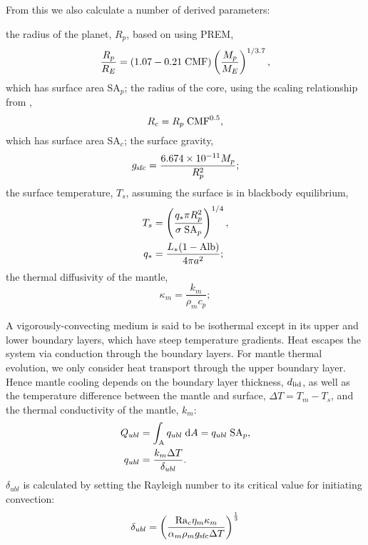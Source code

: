 \documentclass[10pt,a4paper]{article}
\begin{document}
From this we also calculate a number of derived parameters:

the radius of the planet, $R_p$, based on \citet{Zeng2016} using PREM,
\begin{equation}
\frac{R_p}{R_E} = (1.07 - 0.21\; {\rm CMF})\left(\frac{M_p}{M_E}\right)^{1/3.7},
\end{equation}
which has surface area SA$_p$; the radius of the core, using the scaling relationship from \citet{Zeng2017},
\begin{equation}
R_c = R_p \; {\rm CMF}^{0.5},
\end{equation}
which has surface area SA$_c$; the surface gravity,
\begin{equation}
g_{\rm sfc} =\frac{6.674\times 10^{-11}M_p}{R_p^2};
\end{equation}
the surface temperature, $T_s$, assuming the surface is in blackbody equilibrium,
\begin{align}
T_s &= \left(\frac{q_* \pi R_p^2}{\sigma \; {\rm SA}_p}\right)^{1/4},\\
q_* &= \frac{L_*(1-{\rm Alb})}{4 \pi a^2};
\end{align}
the thermal diffusivity of the mantle,
\begin{equation}
\kappa_m = \frac{k_m}{\rho_m c_p};
\end{equation}

A vigorously-convecting medium is said to be isothermal except in its upper and lower boundary layers, which have steep temperature gradients.  Heat escapes the system via conduction through the boundary layers. For mantle thermal evolution, we only consider heat transport through the upper boundary layer. Hence mantle cooling depends on the boundary layer thickness, $d_{\rm lid}$, as well as the temperature difference between the mantle and surface, $\Delta T = T_m - T_s$, and the thermal conductivity of the mantle, $k_m$:
\begin{align}
Q_{ubl} &= \int_{\rm A} q_{ubl} \; {\rm d}A = q_{ubl} \; {\rm SA}_p,\\
q_{ubl} &= \frac{k_m \Delta T}{\delta_{ubl}}.
\label{eq:q_ubl}
\end{align}
$\delta_{ubl}$ is calculated by setting the Rayleigh number to its critical value for initiating convection:
\begin{equation}
\delta_{ubl} = \left(\frac{{\rm Ra}_c \eta_m \kappa_m}{\alpha_m \rho_m g_{\rm sfc} \Delta T}\right)^{\frac{1}{3}}
\label{eq:d_ubl}
\end{equation}
\end{document}
